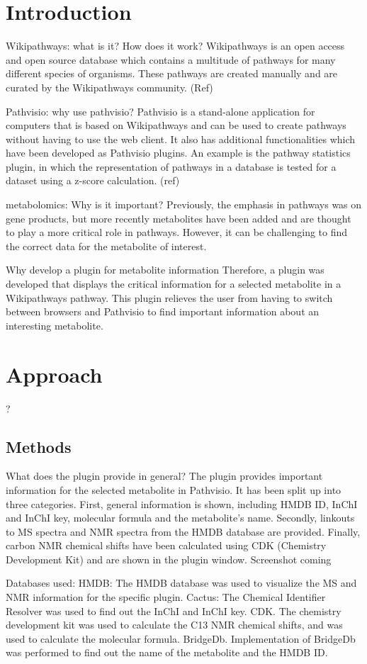 \documentclass{bioinfo}
\begin{document}
\section{Introduction}
Wikipathways: what is it? How does it work?
Wikipathways is an open access and open source database which contains a multitude of pathways for many different species of organisms. These pathways are created manually and are curated by the Wikipathways community. (Ref) 

Pathvisio: why use pathvisio?
Pathvisio is a stand-alone application for computers that is based on Wikipathways and can be used to create pathways without having to use the web client. It also has additional functionalities which have been developed as Pathvisio plugins. An example is the pathway statistics plugin, in which the representation of pathways in a database is tested for a dataset using a z-score calculation. (ref)

metabolomics: Why is it important?
Previously, the emphasis in pathways was on gene products, but more recently metabolites have been added and are thought to play a more critical role in pathways. However, it can be challenging to find the correct data for the metabolite of interest.
 
Why develop a plugin for metabolite information
Therefore, a plugin was developed that displays the critical information for a selected metabolite in a Wikipathways pathway. This plugin relieves the user from having to switch between browsers and Pathvisio to find important information about an interesting metabolite.
\section{Approach}
?

\begin{methods}
\section{Methods}

What does the plugin provide in general?
The plugin provides important information for the selected metabolite in Pathvisio. It has been split up into three categories. First, general information is shown, including HMDB ID, InChI and InChI key, molecular formula and the metabolite's name. Secondly, linkouts to MS spectra and NMR spectra from the HMDB database are provided. Finally, carbon NMR chemical shifts have been calculated using CDK (Chemistry Development Kit) and are shown in the plugin window.
Screenshot
coming

Databases used:
HMDB: The HMDB database was used to visualize the MS and NMR information for the specific plugin.
Cactus: The Chemical Identifier Resolver was used to find out the InChI and InChI key.
CDK. The chemistry development kit was used to calculate the C13 NMR chemical shifts, and was used to calculate the molecular formula.
BridgeDb. Implementation of BridgeDb was performed to find out the name of the metabolite and the HMDB ID.


\end{methods}
\end{document}
